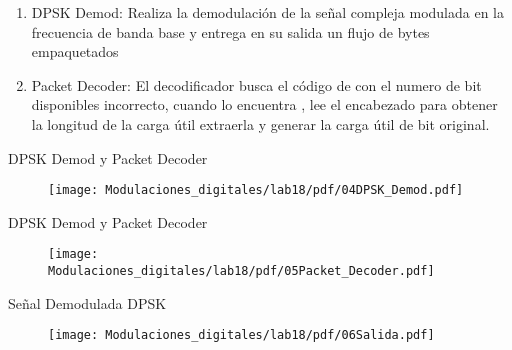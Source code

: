 	\begin{frame}
	\begin{enumerate}[1.]
	\frametitle{\underline{\textbf{Demodulación y Decodificación DPSK}}}
	\item{DPSK Demod: 
Realiza la demodulación de la señal compleja modulada en la frecuencia de banda base y entrega en su salida un flujo de bytes empaquetados }\\
	\item{Packet Decoder: El decodificador busca el código de  con el numero de bit disponibles incorrecto, cuando lo encuentra , lee el encabezado para obtener la longitud de la carga útil extraerla y generar la carga útil de bit original.}\\
	\end{enumerate}
	\end{frame}
	
\begin{frame}{DPSK Demod y Packet Decoder }
\begin{figure}[H]
	\vspace{-3mm}
	\centering
	\texttt{[image: Modulaciones\_digitales/lab18/pdf/04DPSK\_Demod.pdf]}
\end{figure}
\end{frame}

\begin{frame}{DPSK Demod y Packet Decoder}
\begin{figure}[H]
	\vspace{-3mm}
	\centering
	\texttt{[image: Modulaciones\_digitales/lab18/pdf/05Packet\_Decoder.pdf]}
\end{figure}
\end{frame}

\begin{frame}{ Señal Demodulada DPSK}
\begin{figure}[H]
	\vspace{-3mm}
	\centering
	\texttt{[image: Modulaciones\_digitales/lab18/pdf/06Salida.pdf]}
\end{figure}
\end{frame}
		


